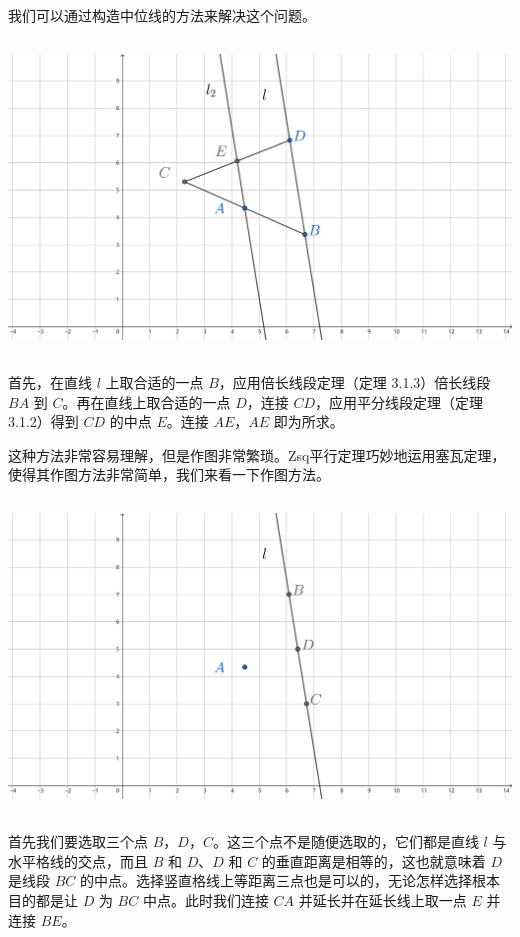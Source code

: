 \documentclass[UTF8]{article}
\begin{document}
我们可以通过构造中位线的方法来解决这个问题。

\includegraphics[width=5.76806in,height=3.27847in]{media/image10.png}

首先，在直线 \(l\) 上取合适的一点 \(B\)，应用倍长线段定理（定理
3.1.3）倍长线段 \(BA\) 到 \(C\)。再在直线上取合适的一点 \(D\)，连接
\(CD\)，应用平分线段定理（定理 3.1.2）得到 \(CD\) 的中点 \(E\)。连接
\(AE\)，\(AE\) 即为所求。

这种方法非常容易理解，但是作图非常繁琐。Zsq平行定理巧妙地运用塞瓦定理，使得其作图方法非常简单，我们来看一下作图方法。

\includegraphics[width=5.76806in,height=3.27847in]{media/image11.png}

首先我们要选取三个点
\(B\)，\(D\)，\(C\)。这三个点不是随便选取的，它们都是直线 \(l\)
与水平格线的交点，而且 \(B\) 和 \(D\)、\(D\) 和 \(C\)
的垂直距离是相等的，这也就意味着 \(D\) 是线段 \(BC\)
的中点。选择竖直格线上等距离三点也是可以的，无论怎样选择根本目的都是让
\(D\) 为 \(BC\) 中点。此时我们连接 \(CA\) 并延长并在延长线上取一点 \(E\)
并连接 \(BE\)。
\end{document}

